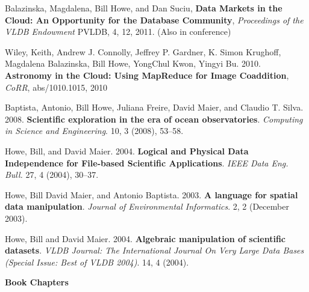 \begin{bulletlist}
\item Balazinska, Magdalena, Bill Howe, and Dan Suciu,
\textbf{Data Markets in the Cloud: An Opportunity for the Database Community},
\emph{Proceedings of the VLDB Endowment} PVLDB, 4, 12, 2011. (Also in conference)

\item Wiley, Keith, Andrew J. Connolly, Jeffrey P. Gardner,
               K. Simon Krughoff, Magdalena Balazinska,
               Bill Howe, YongChul Kwon, Yingyi Bu. 2010.
\textbf{Astronomy in the Cloud: Using MapReduce for Image Coaddition},
\emph{CoRR}, abs/1010.1015, 2010

\item Baptista, Antonio, Bill Howe, Juliana Freire, David Maier, 
and Claudio T. Silva. 2008.
\textbf{Scientific exploration in the era of ocean observatories}.
\emph{Computing in Science and Engineering}. 10, 3 (2008), 53--58.

\item Howe, Bill, and David Maier. 2004. \textbf{Logical and Physical Data Independence for
File-based Scientific Applications}. \emph{IEEE Data Eng. Bull.} 27, 4
(2004), 30--37. 

\item Howe, Bill David Maier, and Antonio Baptista. 2003. 
\textbf{A language for spatial data manipulation}.
\emph{Journal of Environmental Informatics}. 2, 2 (December 2003).

\item Howe, Bill and David Maier. 2004. 
\textbf{Algebraic manipulation of scientific datasets}. \emph{VLDB Journal:
The International Journal On Very Large Data Bases (Special Issue: Best of VLDB 2004)}. 14, 4 (2004). 

\end{bulletlist}

{\bf Book Chapters}

